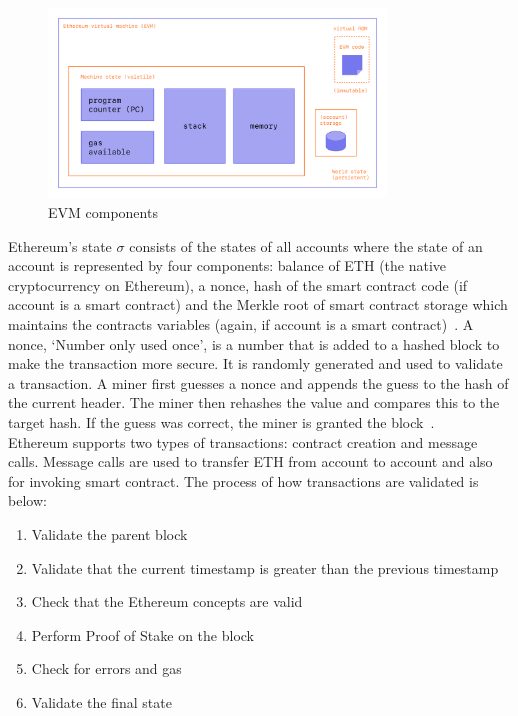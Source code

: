 \begin{figure}[!htb]
    \centering
    \includegraphics[width=0.8\textwidth]{background/Images/evm.png}
    \caption{EVM components~\cite{noauthor_ethereum_nodate}}
\end{figure}

\noindent Ethereum's state $\sigma$ consists of the states of all accounts where the state of an account is represented by four components: balance of ETH (the native cryptocurrency on Ethereum), a nonce, hash of the smart contract code (if account is a smart contract) and the Merkle root of smart contract storage which maintains the contracts variables (again, if account is a smart contract)~\cite{ethereum_yellowpaper}. A nonce, `Number only used once', is a number that is added to a hashed block to make the transaction more secure. It is randomly generated and used to validate a transaction. A miner first guesses a nonce and appends the guess to the hash of the current header. The miner then rehashes the value and compares this to the target hash. If the guess was correct, the miner is granted the block~\cite{noauthor_components_2021}.
\\[3mm]
Ethereum supports two types of transactions: contract creation and message calls. Message calls are used to transfer ETH from account to account and also for invoking smart contract. The process of how transactions are validated is below:
\begin{enumerate}
    \itemsep0em
    \item Validate the parent block
    \item Validate that the current timestamp is greater than the previous timestamp
    \item Check that the Ethereum concepts are valid
    \item Perform Proof of Stake on the block
    \item Check for errors and gas
    \item Validate the final state
\end{enumerate}

